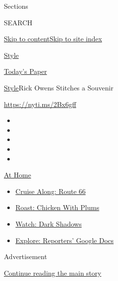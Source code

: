 Sections

SEARCH

\protect\hyperlink{site-content}{Skip to
content}\protect\hyperlink{site-index}{Skip to site index}

\href{https://www.nytimes3xbfgragh.onion/section/style}{Style}

\href{https://myaccount.nytimes3xbfgragh.onion/auth/login?response_type=cookie\&client_id=vi}{}

\href{https://www.nytimes3xbfgragh.onion/section/todayspaper}{Today's
Paper}

\href{/section/style}{Style}\textbar{}Rick Owens Stitches a Souvenir

\url{https://nyti.ms/2Bx6gff}

\begin{itemize}
\item
\item
\item
\item
\item
\end{itemize}

\href{https://www.nytimes3xbfgragh.onion/spotlight/at-home?action=click\&pgtype=Article\&state=default\&region=TOP_BANNER\&context=at_home_menu}{At
Home}

\begin{itemize}
\tightlist
\item
  \href{https://www.nytimes3xbfgragh.onion/2020/09/07/travel/route-66.html?action=click\&pgtype=Article\&state=default\&region=TOP_BANNER\&context=at_home_menu}{Cruise
  Along: Route 66}
\item
  \href{https://www.nytimes3xbfgragh.onion/2020/09/04/dining/sheet-pan-chicken.html?action=click\&pgtype=Article\&state=default\&region=TOP_BANNER\&context=at_home_menu}{Roast:
  Chicken With Plums}
\item
  \href{https://www.nytimes3xbfgragh.onion/2020/09/04/arts/television/dark-shadows-stream.html?action=click\&pgtype=Article\&state=default\&region=TOP_BANNER\&context=at_home_menu}{Watch:
  Dark Shadows}
\item
  \href{https://www.nytimes3xbfgragh.onion/interactive/2020/at-home/even-more-reporters-editors-diaries-lists-recommendations.html?action=click\&pgtype=Article\&state=default\&region=TOP_BANNER\&context=at_home_menu}{Explore:
  Reporters' Google Docs}
\end{itemize}

Advertisement

\protect\hyperlink{after-top}{Continue reading the main story}

